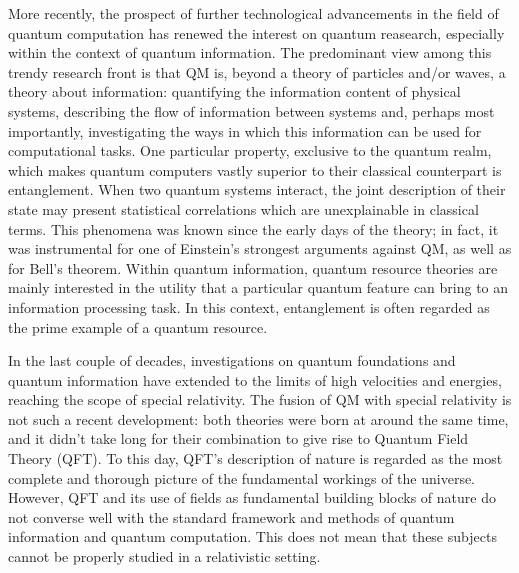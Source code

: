 \documentclass[12pt,a4paper,notitlepage]{report}
\begin{document}
More recently, the prospect of further technological advancements in the field of quantum computation has renewed the interest on quantum reasearch, especially within the context of quantum information. The predominant view among this trendy research front is that QM is, beyond a theory of particles and/or waves, a theory about information: quantifying the information content of physical systems, describing the flow of information between systems and, perhaps most importantly, investigating the ways in which this information can be used for computational tasks. One particular property, exclusive to the quantum realm, which makes quantum computers vastly superior to their classical counterpart is entanglement\cite{horodecki_2009}. When two quantum systems interact, the joint description of their state may present statistical correlations which are unexplainable in classical terms. This phenomena was known since the early days of the theory; in fact, it was instrumental for one of Einstein's strongest arguments against QM, as well as for Bell's theorem. Within quantum information, quantum resource theories \cite{chitambar_2019} are mainly interested in the utility that a particular quantum feature can bring to an information processing task. In this context, entanglement is often regarded as the prime example of a quantum resource.

In the last couple of decades, investigations on quantum foundations and quantum information have extended to the limits of high velocities and energies, reaching the scope of special relativity. The fusion of QM with special relativity is not such a recent development: both theories were born at around the same time, and it didn't take long for their combination to give rise to Quantum Field Theory (QFT). To this day, QFT's description of nature is regarded as the most complete and thorough picture of the fundamental workings of the universe.
However, QFT and its use of fields as fundamental building blocks of nature do not converse well with the standard framework and methods of quantum information and quantum computation. This does not mean that these subjects cannot be properly studied in a relativistic setting.
\end{document}
